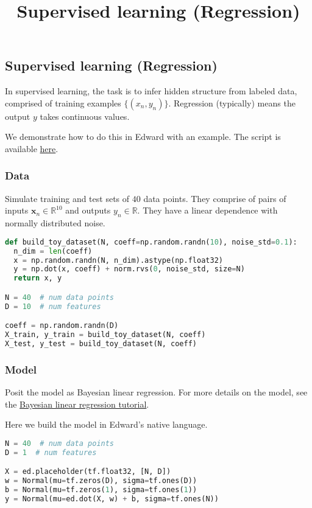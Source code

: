 \title{Supervised learning (Regression)}

\subsection{Supervised learning (Regression)}

In supervised learning, the task is to infer hidden structure from
labeled data, comprised of training examples $\{(x_n, y_n)\}$.
Regression (typically) means the output $y$ takes continuous values.

We demonstrate how to do this in Edward with an example.
The script is available
\href{https://github.com/blei-lab/edward/blob/master/examples/bayesian_linear_regression_test.py}
{here}.


\subsubsection{Data}

Simulate training and test sets of $40$ data points. They comprise of
pairs of inputs $\mathbf{x}_n\in\mathbb{R}^{10}$ and outputs
$y_n\in\mathbb{R}$. They have a linear dependence with normally
distributed noise.

\begin{lstlisting}[language=Python]
def build_toy_dataset(N, coeff=np.random.randn(10), noise_std=0.1):
  n_dim = len(coeff)
  x = np.random.randn(N, n_dim).astype(np.float32)
  y = np.dot(x, coeff) + norm.rvs(0, noise_std, size=N)
  return x, y

N = 40  # num data points
D = 10  # num features

coeff = np.random.randn(D)
X_train, y_train = build_toy_dataset(N, coeff)
X_test, y_test = build_toy_dataset(N, coeff)
\end{lstlisting}


\subsubsection{Model}

Posit the model as Bayesian linear regression. For more details on the
model, see the
\href{tut_bayesian_linear_regression}
{Bayesian linear regression tutorial}.

Here we build the model in Edward's native language.
\begin{lstlisting}[language=Python]
N = 40  # num data points
D = 1  # num features

X = ed.placeholder(tf.float32, [N, D])
w = Normal(mu=tf.zeros(D), sigma=tf.ones(D))
b = Normal(mu=tf.zeros(1), sigma=tf.ones(1))
y = Normal(mu=ed.dot(X, w) + b, sigma=tf.ones(N))
\end{lstlisting}


